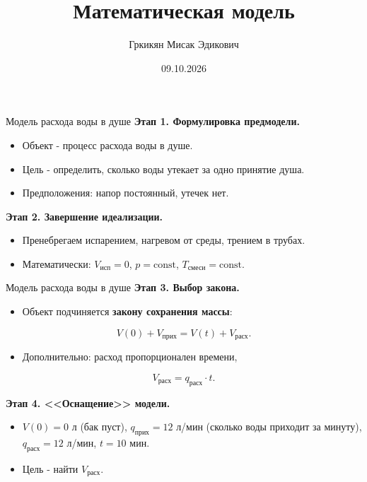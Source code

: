 \documentclass{beamer}
\title[Математическое моделирование]{Математическая модель}
\author[Гркикян М.Э.]{Гркикян Мисак Эдикович}
\date{09.10.2026}
\begin{document}
    \begin{frame}
        \titlepage
    \end{frame}

    \begin{frame}{Модель расхода воды в душе}
        \textbf{Этап 1. Формулировка предмодели.}
        \begin{itemize}
            \item Объект - процесс расхода воды в душе.
            \item Цель - определить, сколько воды утекает за одно принятие душа.
            \item Предположения: напор постоянный, утечек нет.
        \end{itemize}

        \medskip
        \textbf{Этап 2. Завершение идеализации.}
        \begin{itemize}
            \item Пренебрегаем испарением, нагревом от среды, трением в трубах.
            \item Математически:
                $V_{\text{исп}} = 0$,\;
                $p = \text{const}$,\;
                $T_{\text{смеси}} = \text{const}$.
        \end{itemize}
    \end{frame}

    \begin{frame}{Модель расхода воды в душе}
        \textbf{Этап 3. Выбор закона.}
        \begin{itemize}
            \item Объект подчиняется \textbf{закону сохранения массы}:
        \end{itemize}
        \[
            V(0) + V_{\text{прих}} = V(t) + V_{\text{расх}}.
        \]
        \begin{itemize}
            \item Дополнительно: расход пропорционален времени,
        \end{itemize}
        \[
            V_{\text{расх}} = q_{\text{расх}} \cdot t.
        \]

        \medskip
        \textbf{Этап 4. <<Оснащение>> модели.}
        \begin{itemize}
            \item $V(0) = 0$ л (бак пуст), $q_{\text{прих}} = 12$ л/мин (сколько воды приходит за минуту),
                $q_{\text{расх}} = 12$ л/мин, $t = 10$ мин.
            \item Цель - найти $V_{\text{расх}}$.
        \end{itemize}
    \end{frame}
\end{document}
